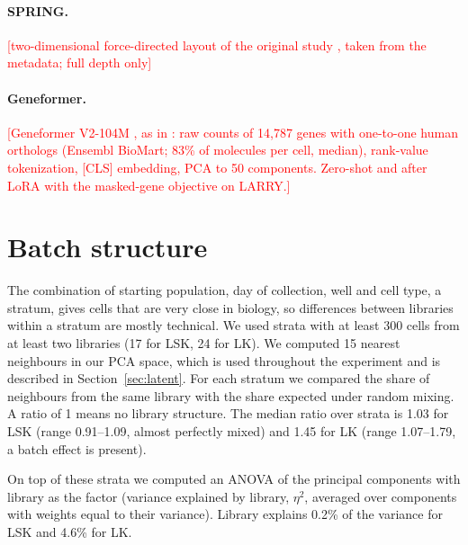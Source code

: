 \documentclass[10pt,a4paper,twocolumn]{article}
\newcommand{\todo}[1]{\textcolor{red}{[#1]}}
\begin{document}
\paragraph{SPRING.}
\todo{two-dimensional force-directed layout of the original study \cite{TODO-weinreb2018spring},
taken from the metadata; full depth only}

\paragraph{Geneformer.}
\todo{Geneformer V2-104M \cite{TODO-theodoris2023}, as in \cite{TODO-zhou2026}: raw counts of
14{,}787 genes with one-to-one human orthologs (Ensembl BioMart; 83\% of molecules per cell, median),
rank-value tokenization, [CLS] embedding, PCA to 50 components. Zero-shot and after LoRA
\cite{TODO-hu2021lora} with the masked-gene objective on LARRY.}




\appendix
\renewcommand{\thetable}{S\arabic{table}}
\renewcommand{\thefigure}{S\arabic{figure}}
\setcounter{table}{0}
\setcounter{figure}{0}

\section{Batch structure}
\label{sec:batch}
The combination of starting population, day of collection, well and cell type, a stratum, gives
cells that are very close in biology, so differences between libraries within a stratum are
mostly technical. We used strata with at least 300 cells from at least two libraries (17 for LSK,
24 for LK). We computed 15 nearest neighbours in our PCA space, which is used throughout the
experiment and is described in Section~\ref{sec:latent}. For each stratum we compared the share of
neighbours from the same library with the share expected under random mixing. A ratio of 1 means
no library structure. The median ratio over strata is 1.03 for LSK (range 0.91--1.09, almost
perfectly mixed) and 1.45 for LK (range 1.07--1.79, a batch effect is present).

On top of these strata we computed an ANOVA of the principal components with library as the
factor (variance explained by library, $\eta^2$, averaged over components with weights equal to
their variance). Library explains 0.2\% of the variance for LSK and 4.6\% for LK.
\end{document}
